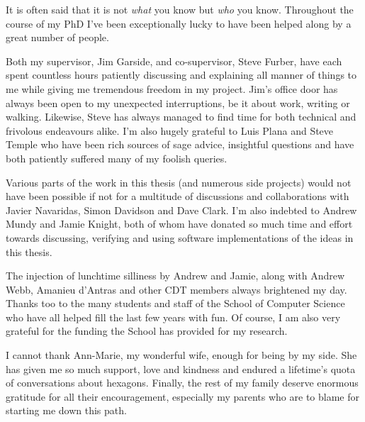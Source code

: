 {
	
	
	It is often said that it is not \emph{what} you know but \emph{who} you know.
	Throughout the course of my PhD I've been exceptionally lucky to have been
	helped along by a great number of people.
	
	Both my supervisor, Jim Garside, and co-supervisor, Steve Furber, have each
	spent countless hours patiently discussing and explaining all manner of
	things to me while giving me tremendous freedom in my project. Jim's office
	door has always been open to my unexpected interruptions, be it about work,
	writing or walking.  Likewise, Steve has always managed to find time for both
	technical and frivolous endeavours alike. I'm also hugely grateful to Luis
	Plana and Steve Temple who have been rich sources of sage advice, insightful
	questions and have both patiently suffered many of my foolish queries.
	
	Various parts of the work in this thesis (and numerous side projects) would
	not have been possible if not for a multitude of discussions and
	collaborations with Javier Navaridas, Simon Davidson and Dave Clark. I'm also
	indebted to Andrew Mundy and Jamie Knight, both of whom have donated so much
	time and effort towards discussing, verifying and using software
	implementations of the ideas in this thesis.
	
	The injection of lunchtime silliness by Andrew and Jamie, along with Andrew
	Webb, Amanieu d'Antras and other CDT members always brightened my day.
	Thanks too to the many students and staff of the School of Computer Science
	who have all helped fill the last few years with fun. Of course, I am also
	very grateful for the funding the School has provided for my research.
	
	I cannot thank Ann-Marie, my wonderful wife, enough for being by my side. She
	has given me so much support, love and kindness and endured a lifetime's
	quota of conversations about hexagons. Finally, the rest of my family deserve
	enormous gratitude for all their encouragement, especially my parents who are
	to blame for starting me down this path.
	
	\par%
}
